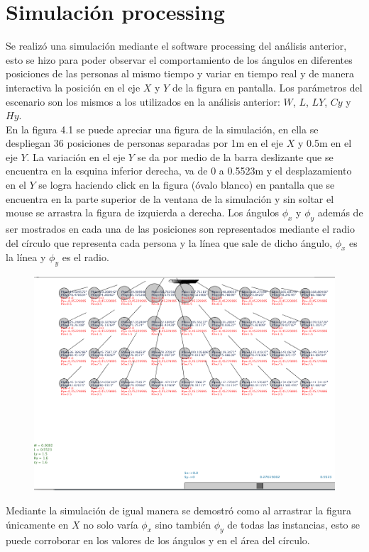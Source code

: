       \section{Simulación processing}
      Se realizó una simulación mediante el software processing del análisis anterior, esto se hizo para poder observar el comportamiento de los ángulos en diferentes posiciones de las personas al mismo tiempo y variar en tiempo real y de manera interactiva la posición en el eje $X$ y $Y$ de la figura en pantalla. Los parámetros del escenario son los mismos a los utilizados en la análisis anterior: $W$, $L$, $LY$, $Cy$ y $Hy$. \\
      En la figura 4.1 se puede apreciar una figura de la simulación, en ella se despliegan 36 posiciones de personas separadas por 1m en el eje $X$ y 0.5m en el eje $Y$. La variación en el eje $Y$ se da por medio de la barra deslizante que se encuentra en la esquina inferior derecha, va de 0 a 0.5523m y el desplazamiento en el $Y$ se logra haciendo click en la figura (óvalo blanco) en pantalla que se encuentra en la parte superior de la ventana de la simulación y sin soltar el mouse se arrastra la figura de izquierda a derecha. Los ángulos $\phi_x$ y $\phi_y$ además de ser mostrados en cada una de las posiciones son representados mediante el radio del círculo que representa cada persona y la línea que sale de dicho ángulo, $\phi_x$ es la línea y $\phi_y$ es el radio.\\
      \begin{figure}[htbp]
      	\centering
      	\includegraphics[width=1\textwidth]{./pictures/sim}
      	\caption{}\label{fig: figura}
      \end{figure}
      Mediante la simulación de igual manera se demostró como al arrastrar la figura únicamente en $X$ no solo varía $\phi_x$ sino también $\phi_y$ de todas las instancias, esto se puede corroborar en los valores de los ángulos y en el área del círculo.
      
